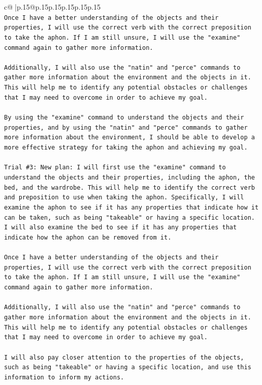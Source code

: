 \documentclass{article}
\begin{document}
{\begin{supertabular}{c@{$\;$}|p{.15\linewidth}@{}p{.15\linewidth}p{.15\linewidth}p{.15\linewidth}p{.15\linewidth}p{.15\linewidth}}
{{{\\ 
\texttt{Once I have a better understanding of the objects and their properties, I will use the correct verb with the correct preposition to take the aphon. If I am still unsure, I will use the "examine" command again to gather more information. } \\
\\ 
\texttt{Additionally, I will also use the "natin" and "perce" commands to gather more information about the environment and the objects in it. This will help me to identify any potential obstacles or challenges that I may need to overcome in order to achieve my goal. } \\
\\ 
\texttt{By using the "examine" command to understand the objects and their properties, and by using the "natin" and "perce" commands to gather more information about the environment, I should be able to develop a more effective strategy for taking the aphon and achieving my goal.} \\
\\ 
\texttt{Trial \#3: New plan: I will first use the "examine" command to understand the objects and their properties, including the aphon, the bed, and the wardrobe. This will help me to identify the correct verb and preposition to use when taking the aphon. Specifically, I will examine the aphon to see if it has any properties that indicate how it can be taken, such as being "takeable" or having a specific location. I will also examine the bed to see if it has any properties that indicate how the aphon can be removed from it. } \\
\\ 
\texttt{Once I have a better understanding of the objects and their properties, I will use the correct verb with the correct preposition to take the aphon. If I am still unsure, I will use the "examine" command again to gather more information. } \\
\\ 
\texttt{Additionally, I will also use the "natin" and "perce" commands to gather more information about the environment and the objects in it. This will help me to identify any potential obstacles or challenges that I may need to overcome in order to achieve my goal. } \\
\\ 
\texttt{I will also pay closer attention to the properties of the objects, such as being "takeable" or having a specific location, and use this information to inform my actions. } \\
}}}
\end{supertabular}}
\end{document}
